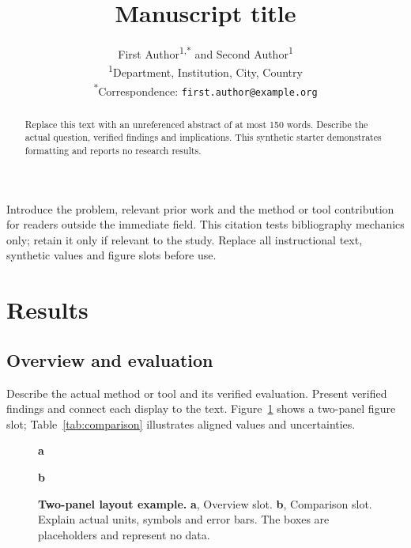 \documentclass[11pt]{article}
\title{Manuscript title}
\author{First Author\textsuperscript{1,*} and Second Author\textsuperscript{1}\\
  \small \textsuperscript{1}Department, Institution, City, Country\\
  \small \textsuperscript{*}Correspondence: \texttt{first.author@example.org}}
\date{}
\begin{document}
\maketitle
\begin{abstract}
Replace this text with an unreferenced abstract of at most 150 words.
Describe the actual question, verified findings and implications. This
synthetic starter demonstrates formatting and reports no research results.
\end{abstract}

Introduce the problem, relevant prior work and the method or tool contribution
for readers outside the immediate field. This citation tests bibliography
mechanics only; retain it only if relevant to the study\cite{wilkinson2016fair}.
Replace all instructional text, synthetic values and figure slots before use.

\section{Results}\label{sec:results}
\subsection{Overview and evaluation}
Describe the actual method or tool and its verified evaluation.
Present verified findings and connect each display to the text.
Figure~\ref{fig:comparison} shows a two-panel figure slot; Table~\ref{tab:comparison}
illustrates aligned values and uncertainties.
\begin{figure}[htbp]
\centering
\begin{minipage}[t]{0.47\linewidth}
\centering\textbf{a}\par\smallskip
{}
\end{minipage}\hfill
\begin{minipage}[t]{0.47\linewidth}
\centering\textbf{b}\par\smallskip
{}
\end{minipage}
\caption{\textbf{Two-panel layout example.} \textbf{a}, Overview slot.
\textbf{b}, Comparison slot. Explain actual units, symbols and error bars.
The boxes are placeholders and represent no data.}
\label{fig:comparison}
\end{figure}
\end{document}
